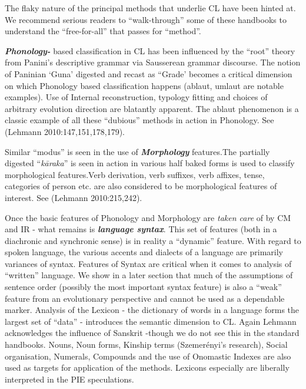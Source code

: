 The flaky nature of the principal methods that underlie CL have been hinted at. We recommend serious readers to “walk-through” some of these handbooks to understand the “free-for-all” that passes for “method”.

\textbf{\textit{Phonology-}} based classification in CL has been influenced by the “root” theory from Panini’s descriptive grammar via Sausserean grammar discourse. The notion of Paninian ‘Guna’ digested and recast as “Grade’ becomes a critical dimension on which Phonology based classification happens (ablaut, umlaut are notable examples). Use of Internal reconstruction, typology fitting and choices of arbitrary evolution direction are blatantly apparent. The ablaut phenomenon is a classic example of all these “dubious” methods in action in Phonology. See (Lehmann 2010:147,151,178,179).

Similar “modus” is seen in the use of \textbf{\textit{Morphology}} features.The partially digested “\textit{kāraka}” is seen in action in various half baked forms is used to classify morphological features.Verb derivation, verb suffixes, verb affixes, tense, categories of person etc. are also considered to be morphological features of interest. See (Lehmann 2010:215,242).

Once the basic features of Phonology and Morphology are \textit{taken care} of by CM and IR - what remains is \textbf{\textit{language syntax}}. This set of features (both in a diachronic and synchronic sense) is in reality a “dynamic” feature. With regard to spoken language, the various accents and dialects of a language are primarily variances of syntax. Features of Syntax are critical when it comes to analysis of “written” language. We show in a later section that much of the assumptions of sentence order (possibly the most important syntax feature) is also a “weak” feature from an evolutionary perspective and cannot be used as a dependable marker. Analysis of the Lexicon - the dictionary of words in a language forms the largest set of “data” - introduces the semantic dimension to CL. Again Lehmann acknowledges the influence of Sanskrit -though we do not see this in the standard handbooks. Nouns, Noun forms, Kinship terms (Szemerényi’s research), Social organisation, Numerals, Compounds and the use of Onomastic Indexes are also used as targets for application of the methods. Lexicons especially are liberally interpreted in the PIE speculations.

